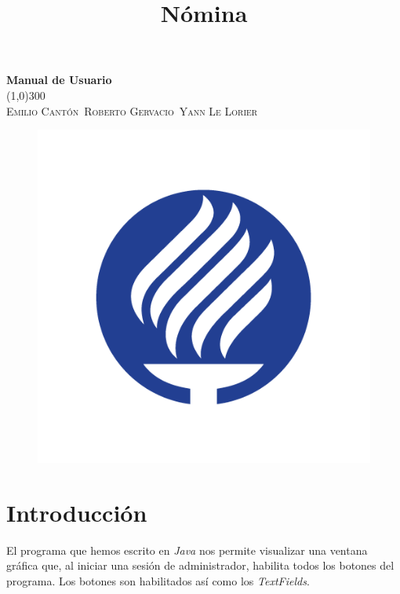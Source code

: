 \documentclass[12pt]{amsart}
\title{N\'omina}
\author{}
\date{}
\begin{document}
	

\begin{titlepage}
	\begin{center}
	\huge{\bfseries{Manual de Usuario}}\\
	[0.1cm]
	\line(1,0){300}\\
	\textsc{\small{Emilio Cant\'on}}\
	\textsc{\small{Roberto Gervacio}}\
	\textsc{\small{Yann Le Lorier}}
	\begin{figure}
		\includegraphics[width=\linewidth]{Tec.jpg}
		\label{fig:Tec}
	\end{figure}
	
	\end{center}

\end{titlepage}

\maketitle
\tableofcontents

\section{Introducci\'on}
{El programa que hemos escrito en \textit{Java} nos permite visualizar una ventana gr\'afica que, al iniciar una sesi\'on de administrador, habilita todos los botones del programa. Los botones son habilitados as\'i como los \textit{TextFields}.}
\end{document}
